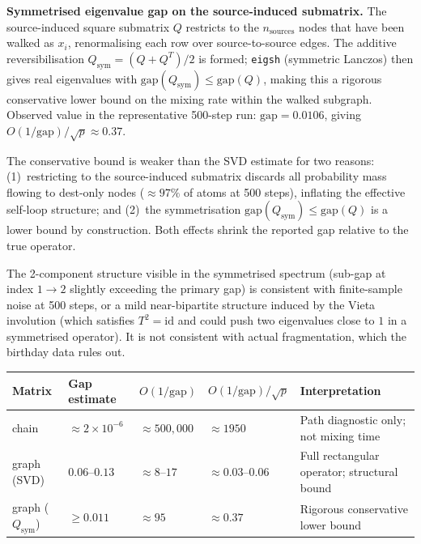 \documentclass[11pt]{article}
\theoremstyle{definition}
\theoremstyle{remark}
\newcommand{\BigO}[1]{O\!\left(#1\right)}
\begin{document}
\medskip
\noindent\textbf{Symmetrised eigenvalue gap on the source-induced submatrix.}
The source-induced square submatrix $Q$ restricts to the $n_\text{sources}$
nodes that have been walked as $x_i$, renormalising each row over
source-to-source edges. The additive reversibilisation
$Q_\text{sym} = (Q + Q^T)/2$ is formed; \texttt{eigsh} (symmetric Lanczos)
then gives real eigenvalues with $\mathrm{gap}(Q_\text{sym}) \leq
\mathrm{gap}(Q)$, making this a rigorous conservative lower bound on the mixing
rate within the walked subgraph. Observed value in the representative 500-step
run: $\mathrm{gap} = 0.0106$, giving $\BigO{1/\mathrm{gap}}/\sqrt{p} \approx
0.37$.

The conservative bound is weaker than the SVD estimate for two reasons:
(1)~restricting to the source-induced submatrix discards all probability mass
flowing to dest-only nodes (${\approx}97\%$ of atoms at 500 steps), inflating
the effective self-loop structure; and (2)~the symmetrisation
$\mathrm{gap}(Q_\text{sym}) \leq \mathrm{gap}(Q)$ is a lower bound by
construction. Both effects shrink the reported gap relative to the true
operator.

The 2-component structure visible in the symmetrised spectrum (sub-gap at index
$1 \to 2$ slightly exceeding the primary gap) is consistent with finite-sample
noise at 500 steps, or a mild near-bipartite structure induced by the Vieta
involution (which satisfies $T^2 = \mathrm{id}$ and could push two eigenvalues
close to $1$ in a symmetrised operator). It is not consistent with actual
fragmentation, which the birthday data rules out.

\begin{center}
\begin{tabular}{lllll}
  \toprule
  Matrix & Gap estimate & $\BigO{1/\mathrm{gap}}$ & $\BigO{1/\mathrm{gap}}/\sqrt{p}$ & Interpretation \\
  \midrule
  chain         & ${\approx}2\times10^{-6}$ & ${\approx}500{,}000$ & ${\approx}1950$ & Path diagnostic only; not mixing time \\
  graph (SVD)   & $0.06$--$0.13$            & ${\approx}8$--$17$   & ${\approx}0.03$--$0.06$ & Full rectangular operator; structural bound \\
  graph ($Q_\text{sym}$) & ${\geq}0.011$   & ${\approx}95$        & ${\approx}0.37$ & Rigorous conservative lower bound \\
  \bottomrule
\end{tabular}
\end{center}
\end{document}
